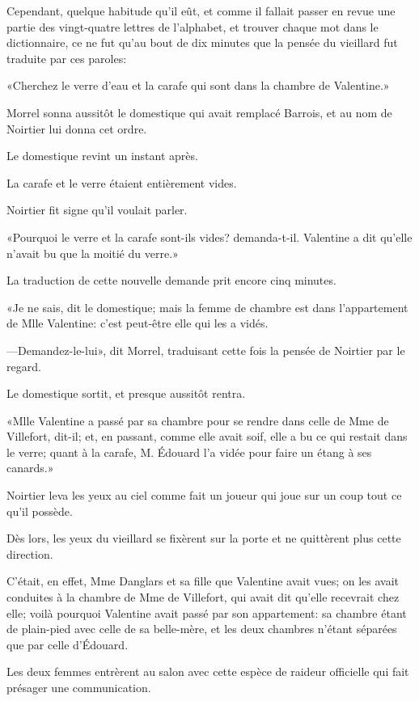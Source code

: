 Cependant, quelque habitude qu'il eût, et comme il fallait passer en revue une partie des vingt-quatre lettres de l'alphabet, et trouver chaque mot dans le dictionnaire, ce ne fut qu'au bout de dix minutes que la pensée du vieillard fut traduite par ces paroles: 

«Cherchez le verre d'eau et la carafe qui sont dans la chambre de Valentine.» 

Morrel sonna aussitôt le domestique qui avait remplacé Barrois, et au nom de Noirtier lui donna cet ordre. 

Le domestique revint un instant après. 

La carafe et le verre étaient entièrement vides. 

Noirtier fit signe qu'il voulait parler. 

«Pourquoi le verre et la carafe sont-ils vides? demanda-t-il. Valentine a dit qu'elle n'avait bu que la moitié du verre.» 

La traduction de cette nouvelle demande prit encore cinq minutes. 

«Je ne sais, dit le domestique; mais la femme de chambre est dans l'appartement de Mlle Valentine: c'est peut-être elle qui les a vidés. 

—Demandez-le-lui», dit Morrel, traduisant cette fois la pensée de Noirtier par le regard. 

Le domestique sortit, et presque aussitôt rentra. 

«Mlle Valentine a passé par sa chambre pour se rendre dans celle de Mme de Villefort, dit-il; et, en passant, comme elle avait soif, elle a bu ce qui restait dans le verre; quant à la carafe, M. Édouard l'a vidée pour faire un étang à ses canards.» 

Noirtier leva les yeux au ciel comme fait un joueur qui joue sur un coup tout ce qu'il possède. 

Dès lors, les yeux du vieillard se fixèrent sur la porte et ne quittèrent plus cette direction. 

C'était, en effet, Mme Danglars et sa fille que Valentine avait vues; on les avait conduites à la chambre de Mme de Villefort, qui avait dit qu'elle recevrait chez elle; voilà pourquoi Valentine avait passé par son appartement: sa chambre étant de plain-pied avec celle de sa belle-mère, et les deux chambres n'étant séparées que par celle d'Édouard. 

Les deux femmes entrèrent au salon avec cette espèce de raideur officielle qui fait présager une communication. 

